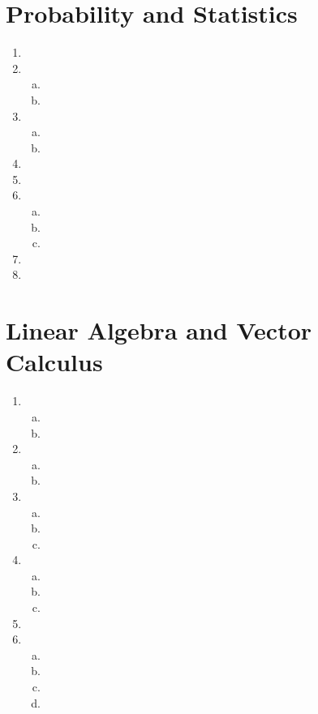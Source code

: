 \documentclass{article}
\begin{document}
\section{Probability and Statistics}
\begin{enumerate}[1.]
\item
\item \begin{enumerate}[a.]
      \item
      \item
      \end{enumerate}
\item \begin{enumerate}[a.]
      \item
      \item
      \end{enumerate}
\item
\item
\item \begin{enumerate}[a.]
      \item
      \item
      \item
      \end{enumerate}
\item
\item
\end{enumerate}
\section{Linear Algebra and Vector Calculus}
\begin{enumerate}
\setcounter{enumi}[8]
\item \begin{enumerate}[a.]
      \item
      \item
      \end{enumerate}
\item \begin{enumerate}[a.]
      \item
      \item
      \end{enumerate}
\item \begin{enumerate}[a.]
      \item
      \item
      \item
      \end{enumerate}
\item \begin{enumerate}[a.]
      \item
      \item
      \item
      \end{enumerate}
\item
\item \begin{enumerate}[a.]
      \item
      \item
      \item
      \item
      \end{enumerate}
\end{enumerate}
\end{document}
